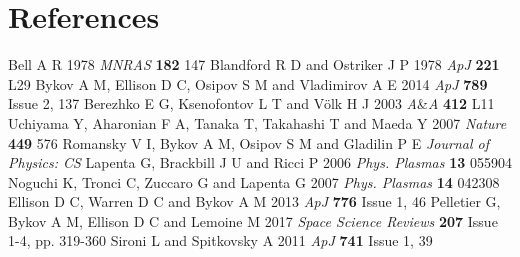\documentclass[a4paper]{jpconf}
\begin{document}
\section*{References}
\begin{thebibliography}{20}
	 Bell A R 1978 \textit{MNRAS} \textbf{182} 147
	 Blandford R D and Ostriker J P 1978 \textit{ApJ} \textbf{221} L29 
	 Bykov A M, Ellison D C, Osipov S M and Vladimirov A E 2014 \textit{ApJ} \textbf{789} Issue 2, 137
	 Berezhko E G, Ksenofontov L T and V{\"o}lk H J  2003 \textit{A}{\&}\textit{A} \textbf{412} L11
	 Uchiyama Y, Aharonian F A, Tanaka T, Takahashi T and Maeda Y 2007 \textit{Nature} \textbf{449} 576
	 Romansky V I, Bykov A M, Osipov S M and Gladilin P E \textit{Journal of Physics: CS}
	 Lapenta G, Brackbill J U and Ricci P 2006 \textit{Phys. Plasmas} \textbf{13} 055904
	 Noguchi K, Tronci C, Zuccaro G and Lapenta G 2007 \textit{Phys. Plasmas} \textbf{14} 042308
	 Ellison D C, Warren D C and Bykov A M 2013 \textit{ApJ} \textbf{776} Issue 1, 46
	 Pelletier G, Bykov A M, Ellison D C and Lemoine M 2017 \textit{Space Science Reviews} \textbf{207} Issue 1-4, pp. 319-360
	 Sironi L and Spitkovsky A 2011 \textit{ApJ} \textbf{741} Issue 1, 39
\end{thebibliography}
\end{document}
